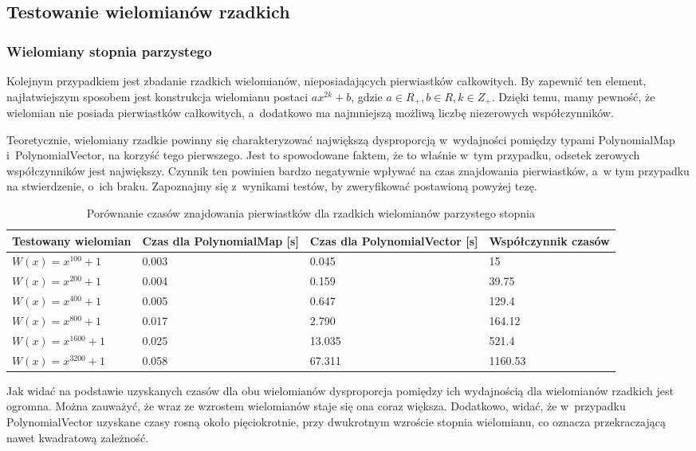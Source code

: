 \subsection{Testowanie wielomianów rzadkich}

\subsubsection{Wielomiany stopnia parzystego}

Kolejnym przypadkiem jest zbadanie rzadkich wielomianów, nieposiadających pierwiastków całkowitych. By zapewnić ten element, najłatwiejszym sposobem jest konstrukcja wielomianu postaci $ax^{2k}+b$, gdzie $a \in R_+, b \in R, k \in Z_+$. Dzięki temu, mamy pewność, że wielomian nie posiada pierwiastków całkowitych, a~dodatkowo ma najmniejszą możliwą liczbę niezerowych współczynników.

Teoretycznie, wielomiany rzadkie powinny się charakteryzować największą dysproporcją w~wydajności pomiędzy typami PolynomialMap i~PolynomialVector, na korzyść tego pierwszego. Jest to spowodowane faktem, że to właśnie w~tym przypadku, odsetek zerowych współczynników jest największy. Czynnik ten powinien bardzo negatywnie wpływać na czas znajdowania pierwiastków, a~w tym przypadku na stwierdzenie, o~ich braku. Zapoznajmy się z~wynikami testów, by zweryfikować postawioną powyżej tezę.

\begin{table}[H]
	\begin{tabular}{ |p{3.5cm}|p{3cm}|p{3cm}|p{3.5cm}|} 
		\hline
		Testowany wielomian & Czas dla PolynomialMap [s] & Czas dla PolynomialVector [s] & Współczynnik czasów \\
		\hline
		$W(x) = x^{100} + 1$ & 0.003 & 0.045 & 15 \\
		$W(x) = x^{200} + 1$ & 0.004 & 0.159 & 39.75 \\
		$W(x) = x^{400} + 1$ & 0.005 & 0.647 & 129.4 \\
		$W(x) = x^{800} + 1$ & 0.017 & 2.790 & 164.12 \\
		$W(x) = x^{1600} + 1$ & 0.025 & 13.035 & 521.4 \\
		$W(x) = x^{3200} + 1$ & 0.058 & 67.311 & 1160.53 \\
		\hline
	\end{tabular}
	\caption{Porównanie czasów znajdowania pierwiastków dla rzadkich wielomianów parzystego stopnia}
\end{table}

Jak widać na podstawie uzyskanych czasów dla obu wielomianów dysproporcja pomiędzy ich wydajnością dla wielomianów rzadkich jest ogromna. Można zauważyć, że wraz ze wzrostem wielomianów staje się ona coraz większa. Dodatkowo, widać, że w~przypadku PolynomialVector uzyskane czasy rosną około pięciokrotnie, przy dwukrotnym wzroście stopnia wielomianu, co oznacza przekraczającą nawet kwadratową zależność.

